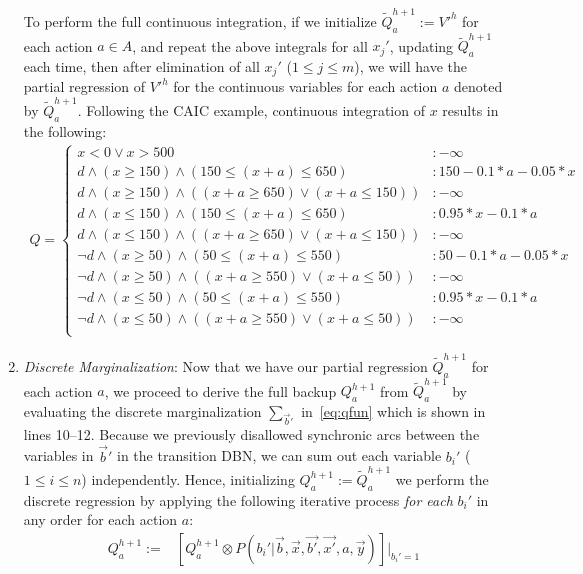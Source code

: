 \documentclass[twoside,11pt]{article}
\begin{document}
\begin{enumerate}
To perform the full continuous integration, 
if we initialize 
$\tilde{Q}_a^{h+1} := V'^{h}$ for each action $a \in A$, and repeat
the above integrals for all $x_j'$, updating $\tilde{Q}_a^{h+1}$ each time,
then after elimination of all $x_j'$ ($1 \leq j \leq m$), we will have 
the partial regression of $V'^{h}$ for the continuous variables for
each action $a$ denoted by $\tilde{Q}_a^{h+1}$. Following the \textsc{CAIC} example, continuous integration of $x$ results in the following: 
{\footnotesize
\begin{align}
Q = \begin{cases}
x < 0 \vee x>500 &: -\infty \\
d \land (x \geq 150) \land (150 \leq (x+a) \leq 650) &:  150 - 0.1 * a - 0.05 * x \\
d \land (x \geq 150) \land ((x+a \geq 650) \vee (x+a \leq 150)) &:  -\infty \\
d \land (x \leq 150) \land (150 \leq (x+a) \leq 650)&:  0.95 * x - 0.1 * a \\
d \land (x \leq 150) \land ((x+a \geq 650) \vee (x+a \leq 150)) &:  -\infty \\
\neg d \land (x \geq 50) \land (50 \leq (x+a) \leq 550)  &:  50 - 0.1 * a - 0.05 * x \\
\neg d \land (x \geq 50) \land ((x+a \geq 550) \vee (x+a \leq 50)) &:  -\infty \\
\neg d \land (x \leq 50) \land (50 \leq (x+a) \leq 550) &:  0.95 * x - 0.1 * a \\
\neg d \land (x \leq 50) \land ((x+a \geq 550) \vee (x+a \leq 50)) &:  -\infty \\
\end{cases} \label{recent_q}
\end{align}
}
\item {\it Discrete Marginalization}: Now that we have our partial
regression $\tilde{Q}_a^{h+1}$ for each action $a$, we proceed
to derive the full backup $Q_a^{h+1}$ from $\tilde{Q}_a^{h+1}$
by evaluating the discrete 
marginalization $\sum_{\vec{b}'}$ in~\eqref{eq:qfun} which is shown in lines 10--12.
Because we previously disallowed synchronic arcs
between the variables in $\vec{b}'$ 
in the transition DBN, we can sum out each variable $b_i'$ ($1 \leq i \leq n$) 
independently.  Hence, initializing
$Q_a^{h+1} := \tilde{Q}_a^{h+1}$
we perform the discrete regression by applying the following iterative
process \emph{for each} $b_i'$ in any order for each action $a$:
\begin{align}
Q_a^{h+1} := & \left[ Q_a^{h+1} \otimes P(b_i'|\vec{b},\vec{x},\vec{b'},\vec{x'},a,\vec{y}) \right]|_{b_i' = 1} 

\end{align}
\end{enumerate}
\end{document}
